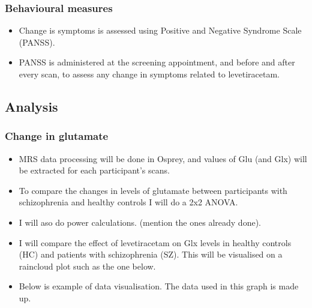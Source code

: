 \documentclass[
  letterpaper,
  DIV=11,
  numbers=noendperiod]{scrartcl}
\providecommand{\tightlist}{%
  \setlength{\itemsep}{0pt}\setlength{\parskip}{0pt}}\usepackage{longtable,booktabs,array}
\begin{document}
\subsubsection{Behavioural measures}\label{behavioural-measures}

\begin{itemize}
\tightlist
\item
  Change is symptoms is assessed using Positive and Negative Syndrome
  Scale (PANSS).
\item
  PANSS is administered at the screening appointment, and before and
  after every scan, to assess any change in symptoms related to
  levetiracetam.
\end{itemize}

\subsection{Analysis}\label{analysis}

\subsubsection{Change in glutamate}\label{change-in-glutamate}

\begin{itemize}
\tightlist
\item
  MRS data processing will be done in Osprey, and values of Glu (and
  Glx) will be extracted for each participant's scans.
\item
  To compare the changes in levels of glutamate between participants
  with schizophrenia and healthy controls I will do a 2x2 ANOVA.
\item
  I will aso do power calculations. (mention the ones already done).
\item
  I will compare the effect of levetiracetam on Glx levels in healthy
  controls (HC) and patients with schizophrenia (SZ). This will be
  visualised on a raincloud plot such as the one below.
\item
  Below is example of data visualisation. The data used in this graph is
  made up.
\end{itemize}
\end{document}
